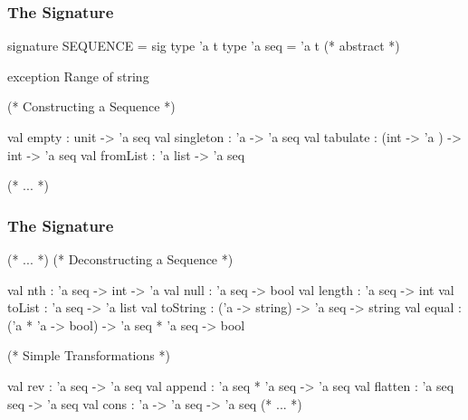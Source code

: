 \documentclass[aspectratio=169]{beamer}
\begin{document}
\begin{frame}[fragile]
  \frametitle{The  Signature}

  \small
  \begin{codeblock}
    signature SEQUENCE =
      sig
        type 'a t
        type 'a seq = 'a t (* abstract *)

        exception Range of string


        (* Constructing a Sequence *)

        val empty : unit -> 'a seq
        val singleton : 'a -> 'a seq
        val tabulate : (int -> 'a ) -> int -> 'a seq
        val fromList : 'a list -> 'a seq

        (* ... *)
  \end{codeblock}
\end{frame}

\begin{frame}[fragile]
  \frametitle{The  Signature}

  \small
  \begin{codeblock}
    (* ... *)
        (* Deconstructing a Sequence *)

        val nth : 'a seq -> int -> 'a
        val null : 'a seq -> bool
        val length : 'a seq -> int
        val toList : 'a seq -> 'a list
        val toString : ('a -> string) -> 'a seq -> string
        val equal : ('a * 'a -> bool) -> 'a seq * 'a seq -> bool

        (* Simple Transformations *)

        val rev : 'a seq -> 'a seq
        val append : 'a seq * 'a seq -> 'a seq
        val flatten : 'a seq seq -> 'a seq
        val cons : 'a -> 'a seq -> 'a seq
    (* ... *)
  \end{codeblock}
\end{frame}
\end{document}
